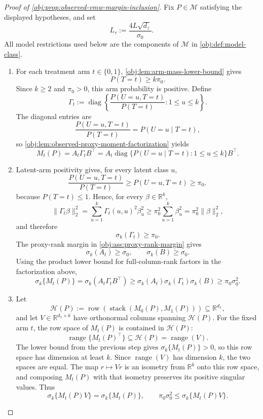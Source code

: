 \documentclass[11pt]{article}
\begin{document}
\begin{proof}[Proof of \cref{obj:prop:observed-vmw-margin-inclusion}]
Fix \(P\in\mathcal M\) satisfying the displayed hypotheses, and set
\[
L_\tau:=\frac{4L\sqrt{d_z}}{\sigma_0}.
\]
All model restrictions used below are the components of \(\mathcal M\) in
\cref{obj:def:model-class}.

\begin{enumerate}
\item For each treatment arm \(t\in\{0,1\}\), \cref{obj:lem:arm-mass-lower-bound} gives
\[
P(T=t)\ge k\pi_0 .
\]
Since \(k\ge2\) and \(\pi_0>0\), this arm probability is positive.  Define
\[
\Gamma_t
:=
\operatorname{diag}\left\{
\frac{P(U=u,T=t)}{P(T=t)}:1\le u\le k
\right\}.
\]
The diagonal entries are
\[
\frac{P(U=u,T=t)}{P(T=t)}
=
P(U=u\mid T=t),
\]
so \cref{obj:lem:observed-proxy-moment-factorization} yields
\[
M_t(P)=A_t\Gamma_tB^\top
=
A_t\operatorname{diag}\{P(U=u\mid T=t):1\le u\le k\}B^\top .
\]

\item Latent-arm positivity gives, for every latent class \(u\),
\[
\frac{P(U=u,T=t)}{P(T=t)}
\ge
P(U=u,T=t)
\ge
\pi_0,
\]
because \(P(T=t)\le1\).  Hence, for every \(\beta\in\mathbb R^k\),
\[
\|\Gamma_t\beta\|_2^2
=
\sum_{u=1}^k \Gamma_t(u,u)^2\beta_u^2
\ge
\pi_0^2\sum_{u=1}^k\beta_u^2
=
\pi_0^2\|\beta\|_2^2,
\]
and therefore
\[
\sigma_k(\Gamma_t)\ge\pi_0 .
\]
The proxy-rank margin in \cref{obj:ass:proxy-rank-margin} gives
\[
\sigma_k(A_t)\ge\sigma_0,
\qquad
\sigma_k(B)\ge\sigma_0 .
\]
Using the product lower bound for full-column-rank factors in the factorization above,
\[
\sigma_k\{M_t(P)\}
=
\sigma_k(A_t\Gamma_tB^\top)
\ge
\sigma_k(A_t)\sigma_k(\Gamma_t)\sigma_k(B)
\ge
\pi_0\sigma_0^2 .
\]

\item Let
\[
\mathcal H(P):=
\operatorname{row}\!\left(\operatorname{stack}(M_0(P),M_1(P))\right)
\subseteq\mathbb R^{d_x},
\]
and let \(V\in\mathbb R^{d_x\times k}\) have orthonormal columns spanning \(\mathcal H(P)\).  For the fixed arm \(t\), the row space of \(M_t(P)\) is contained in \(\mathcal H(P)\):
\[
\operatorname{range}\{M_t(P)^\top\}\subseteq \mathcal H(P)=\operatorname{range}(V).
\]
The lower bound from the previous step gives \(\sigma_k\{M_t(P)\}>0\), so this row space has dimension at least \(k\).  Since \(\operatorname{range}(V)\) has dimension \(k\), the two spaces are equal.  The map \(r\mapsto Vr\) is an isometry from \(\mathbb R^k\) onto this row space, and composing \(M_t(P)\) with that isometry preserves its positive singular values.  Thus
\[
\sigma_k\{M_t(P)V\}
=
\sigma_k\{M_t(P)\},
\qquad
\pi_0\sigma_0^2\le \sigma_k\{M_t(P)V\}.
\]


\end{enumerate}
\end{proof}
\end{document}

